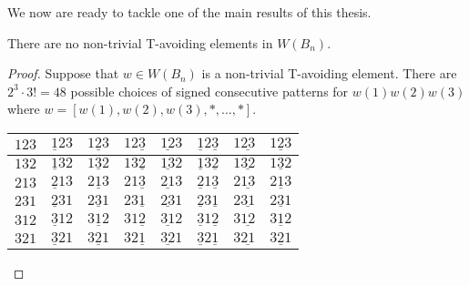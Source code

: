 We now are ready to tackle one of the main results of this thesis.

\begin{theorem}\label{thm:classificationofB}
There are no non-trivial T-avoiding elements in $W(B_n)$.	


\begin{proof}
Suppose that $w \in W(B_n)$ is a non-trivial T-avoiding element. There are $2^3 \cdot 3!=48$ possible choices of signed consecutive patterns for $w(1)w(2)w(3)$ where $w=[w(1), w(2), w(3), \ast, \ldots, \ast]$.

\begin{center}
\begin{tabular}{|l|l|l|l|l|l|l|l|}
\hline
\cellcolor{blue!30}$123$ & \cellcolor{orange2!40}$\underline{1}23$ & \cellcolor{brown!50}$1\underline{2}3$ & \cellcolor{red!25}$12\underline{3}$ & \cellcolor{brown!50}$\underline{12}3$ & \cellcolor{red!25}$\underline{1}2\underline{3}$ & \cellcolor{turq!40}$1\underline{23}$ & \cellcolor{turq!40}$\underline{123}$ \\
\hline
\cellcolor{blue!30}$132$ & \cellcolor{orange2!40}$\underline{1}32$ & \cellcolor{brown!50}$1\underline{3}2$ & \cellcolor{red!25}$13\underline{2}$ & \cellcolor{brown!50}$\underline{13}2$ & \cellcolor{red!25}$\underline{1}3\underline{2}$ & \cellcolor{ggreen!50}$1\underline{32}$ & \cellcolor{ggreen!50}$\underline{132}$ \\
\hline
\cellcolor{blue!30}$213$ & \cellcolor{yellow!50}$\underline{2}13$ & \cellcolor{brown!50}$2\underline{1}3$ & \cellcolor{turq!40}$21\underline{3}$ & \cellcolor{yellow!50}$\underline{21}3$ & \cellcolor{red!25}$\underline{2}1\underline{3}$ & \cellcolor{turq!40}$2\underline{13}$ & \cellcolor{red!25}$\underline{213}$ \\
\hline
\cellcolor{red!25}$231$ & \cellcolor{purple2!50}$\underline{2}31$ & \cellcolor{ggreen!50}$2\underline{3}1$ & \cellcolor{red!25}$23\underline{1}$ & \cellcolor{brown!50}$\underline{23}1$ & \cellcolor{purple2!50}$\underline{2}3\underline{1}$ & \cellcolor{ggreen!50}$2\underline{31}$ & \cellcolor{brown!50}$\underline{231}$ \\
\hline
\cellcolor{ggreen!50}$312$ & \cellcolor{yellow!50}$\underline{3}12$ & \cellcolor{ggreen!50}$3\underline{1}2$ &\cellcolor{turq!40}$31\underline{2}$ & \cellcolor{yellow!50}$\underline{31}2$ & \cellcolor{yellow!50}$\underline{3}1\underline{2}$ & \cellcolor{turq!40}$3\underline{12}$ & \cellcolor{yellow!50}$\underline{312}$ \\
\hline
\cellcolor{turq!40}$321$ & \cellcolor{yellow!50}$\underline{3}21$ & \cellcolor{ggreen!50}$3\underline{2}1$ & \cellcolor{turq!40}$32\underline{1}$ & \cellcolor{yellow!50}$\underline{32}1$ & \cellcolor{yellow!50}$\underline{3}2\underline{1}$ & \cellcolor{ggreen!50}$3\underline{21}$ & \cellcolor{yellow!50}$\underline{321}$\\
\hline
\end{tabular}
\end{center}


\end{proof}
\end{theorem}
